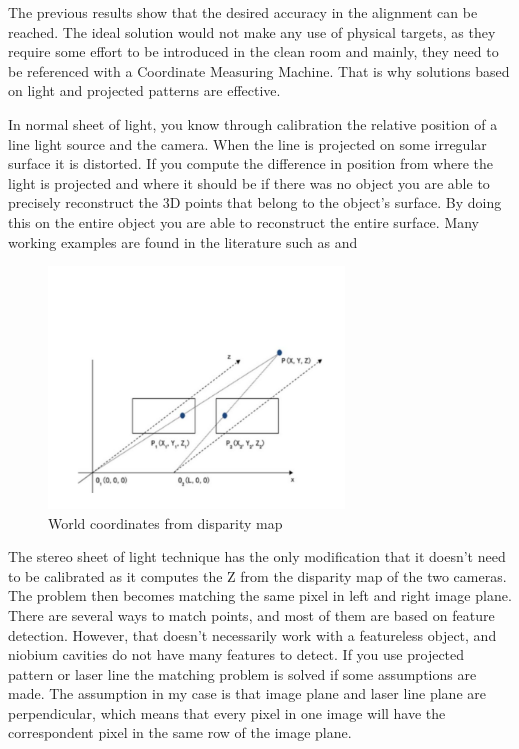 \documentclass[12pt,a4paper]{article}
\begin{document}
The previous results show that the desired accuracy in the alignment can be reached. The ideal solution would not make any use of physical targets, as they require some effort to be introduced in the clean room and mainly, they need to be referenced with a Coordinate Measuring Machine. That is why solutions based on light and projected patterns \cite{zhang_online_2017} are effective. 

 In normal sheet of light, you know through calibration the relative position of a line light source and the camera. When the line is projected on some irregular surface it is distorted. If you compute the difference in position from where the light is projected and where it should be if there was no object you are able to precisely reconstruct the 3D points that belong to the object's surface. By doing this on the entire object you are able to reconstruct the entire surface. Many working examples are found in the literature such as 
\cite{3d_scanner_structured_light} and 
\cite{3d_structured-light_scanner_2019}
 \begin{figure}[h!]
\centering
\includegraphics[width=0.7\textwidth]{14.png}
\caption{World coordinates from disparity map}
\end{figure}
The stereo sheet of light technique has the only modification that it doesn't need to be calibrated as it computes the Z from the disparity map of the two cameras.  The problem then becomes matching the same pixel in left and right image plane. There are several ways to match points, and most of them are based on feature detection. However, that doesn't necessarily work with a featureless object, and niobium cavities do not have many features to detect. If you use projected pattern or laser line the matching problem is solved if some assumptions are made. The assumption in my case is that image plane and laser line plane are perpendicular, which means that every pixel in one image will have the correspondent pixel in the same row of the image plane.
\end{document}
